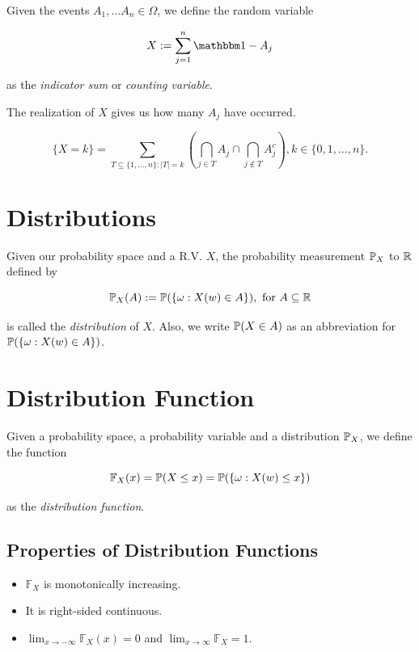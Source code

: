Given the events \(A_1, \dots A_n \in \Omega\), we define the random variable 

\[
    X:= \sum_{j = 1}^{n} \ind-{A_j}   
\]

as the \emph{indicator sum} or \emph{counting variable}. 

The realization of \(X\) gives us how many \(A_j\) have occurred. 

\[
    \{X = k\} = \sum_{T \subseteq \{1, \dots, n\}: |T| = k} \left( \bigcap_{j \in T} A_j \cap \bigcap_{j \notin T} A_{j}^{c} \right), k \in \{0, 1, \dots, n\}.
\]

\section{Distributions}

Given our probability space and a R.V. \(X\), the probability measurement \(\mathbb{P}_X\) to 
\(\mathbb{R}\) defined by 

\[
    \mathbb{P}_X (A) := \mathbb{P}(\{\omega: X(w) \in A\}), \text{ for } A \subseteq \mathbb{R}
\]

is called the \emph{distribution} of \(X\). Also, we write \(\mathbb{P}(X \in A)\) as an abbreviation for
\(\mathbb{P}(\{\omega: X(w) \in A\}) \).

\section{Distribution Function}

Given a probability space, a probability variable and a distribution \(\mathbb{P}_X\), we define 
the function 

\[
    \mathbb{F}_X (x) = \mathbb{P}(X \le x) = \mathbb{P}(\{\omega: X(w) \le x\})
\]

as the \emph{distribution function}.

\subsection{Properties of Distribution Functions}

\begin{itemize}
    
    \item \(\mathbb{F}_X\) is monotonically increasing.

    \item It is right-sided continuous.

    \item \(\lim_{x \to - \infty} \mathbb{F}_X (x) = 0\) and \(\lim_{x \to \infty} \mathbb{F}_X = 1 \).

\end{itemize}

